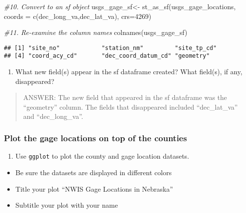 \documentclass[
]{article}
\newenvironment{Shaded}{\begin{snugshade}}{\end{snugshade}}
\newcommand{\AttributeTok}[1]{\textcolor[rgb]{0.77,0.63,0.00}{#1}}
\newcommand{\CommentTok}[1]{\textcolor[rgb]{0.56,0.35,0.01}{\textit{#1}}}
\newcommand{\DecValTok}[1]{\textcolor[rgb]{0.00,0.00,0.81}{#1}}
\newcommand{\FunctionTok}[1]{\textcolor[rgb]{0.00,0.00,0.00}{#1}}
\newcommand{\NormalTok}[1]{#1}
\newcommand{\OtherTok}[1]{\textcolor[rgb]{0.56,0.35,0.01}{#1}}
\newcommand{\StringTok}[1]{\textcolor[rgb]{0.31,0.60,0.02}{#1}}
\providecommand{\tightlist}{%
  \setlength{\itemsep}{0pt}\setlength{\parskip}{0pt}}
\begin{document}
\begin{Shaded}
\begin{Highlighting}[]
\CommentTok{\#10. Convert to an sf object}
\NormalTok{usgs\_gage\_sf}\OtherTok{\textless{}{-}} \FunctionTok{st\_as\_sf}\NormalTok{(usgs\_gage\_locations,}
                          \AttributeTok{coords =} \FunctionTok{c}\NormalTok{(}\StringTok{\textquotesingle{}dec\_long\_va\textquotesingle{}}\NormalTok{,}\StringTok{\textquotesingle{}dec\_lat\_va\textquotesingle{}}\NormalTok{),}
                          \AttributeTok{crs=}\DecValTok{4269}\NormalTok{)}

\CommentTok{\#11. Re{-}examine the column names}
\FunctionTok{colnames}\NormalTok{(usgs\_gage\_sf)}
\end{Highlighting}
\end{Shaded}

\begin{verbatim}
## [1] "site_no"            "station_nm"         "site_tp_cd"        
## [4] "coord_acy_cd"       "dec_coord_datum_cd" "geometry"
\end{verbatim}

\begin{enumerate}
\def\labelenumi{\arabic{enumi}.}
\setcounter{enumi}{11}
\tightlist
\item
  What new field(s) appear in the sf dataframe created? What field(s),
  if any, disappeared?
\end{enumerate}

\begin{quote}
ANSWER: The new field that appeared in the sf dataframe was the
``geometry'' column. The fields that disappeared included
``dec\_lat\_va'' and ``dec\_long\_va''.
\end{quote}

\hypertarget{plot-the-gage-locations-on-top-of-the-counties}{%
\subsubsection{Plot the gage locations on top of the
counties}\label{plot-the-gage-locations-on-top-of-the-counties}}

\begin{enumerate}
\def\labelenumi{\arabic{enumi}.}
\setcounter{enumi}{12}
\tightlist
\item
  Use \texttt{ggplot} to plot the county and gage location datasets.
\end{enumerate}

\begin{itemize}
\tightlist
\item
  Be sure the datasets are displayed in different colors
\item
  Title your plot ``NWIS Gage Locations in Nebraska''
\item
  Subtitle your plot with your name
\end{itemize}
\end{document}
